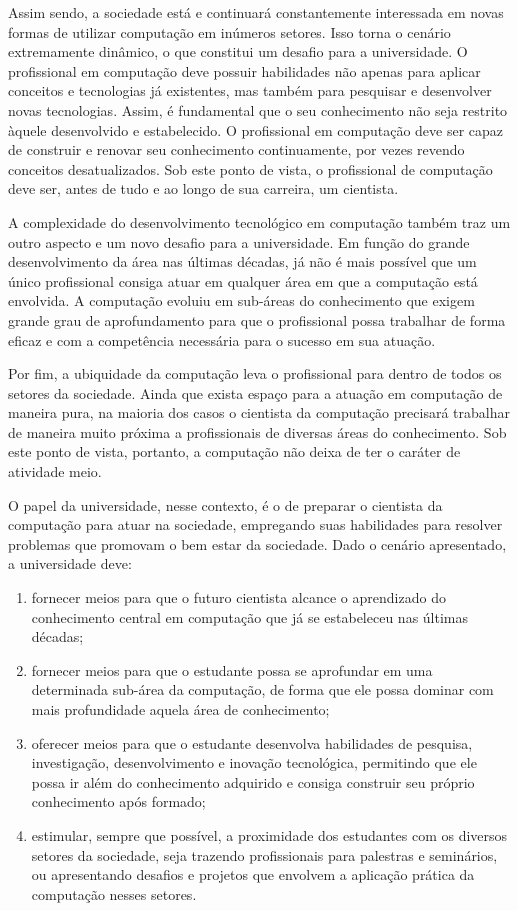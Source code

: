 Assim sendo, a sociedade está e continuará constantemente interessada em novas formas de utilizar computação em inúmeros setores. Isso torna o cenário extremamente dinâmico, o que constitui um desafio para a universidade. O profissional em computação deve possuir habilidades não apenas para aplicar conceitos e tecnologias já existentes, mas também para pesquisar e desenvolver novas tecnologias. Assim, é fundamental que o seu conhecimento não seja restrito àquele desenvolvido e estabelecido. O profissional em computação deve ser capaz de construir e renovar seu conhecimento continuamente, por vezes revendo conceitos desatualizados. Sob este ponto de vista, o profissional de computação deve ser, antes de tudo e ao longo de sua carreira, um cientista.

A complexidade do desenvolvimento tecnológico em computação também traz um outro aspecto e um novo desafio para a universidade. Em função do grande desenvolvimento da área nas últimas décadas, já não é mais possível que um único profissional consiga atuar em qualquer área em que a computação está envolvida. A computação evoluiu em sub-áreas do conhecimento que exigem grande grau de aprofundamento para que o profissional possa trabalhar de forma eficaz e com a competência necessária para o sucesso em sua atuação.

Por fim, a ubiquidade da computação leva o profissional para dentro de todos os setores da sociedade. Ainda que exista espaço para a atuação em computação de maneira pura, na maioria dos casos o cientista da computação precisará trabalhar de maneira muito próxima a profissionais de diversas áreas do conhecimento. Sob este ponto de vista, portanto, a computação não deixa de ter o caráter de atividade meio.

O papel da universidade, nesse contexto, é o de preparar o cientista da computação para atuar na sociedade, empregando suas habilidades para resolver problemas que promovam o bem estar da sociedade. Dado o cenário apresentado, a universidade deve:

\begin{enumerate}
    \item fornecer meios para que o futuro cientista alcance o aprendizado do conhecimento central em computação que já se estabeleceu nas últimas décadas;
    \item fornecer meios para que o estudante possa se aprofundar em uma determinada sub-área da computação, de forma que ele possa dominar com mais profundidade aquela área de conhecimento;
    \item oferecer meios para que o estudante desenvolva habilidades de pesquisa, investigação, desenvolvimento e inovação tecnológica, permitindo que ele possa ir além do conhecimento adquirido e consiga construir seu próprio conhecimento após formado;
    \item estimular, sempre que possível, a proximidade dos estudantes com os diversos setores da sociedade, seja trazendo profissionais para palestras e seminários, ou apresentando desafios e projetos que envolvem a aplicação prática da computação nesses setores.
\end{enumerate}

